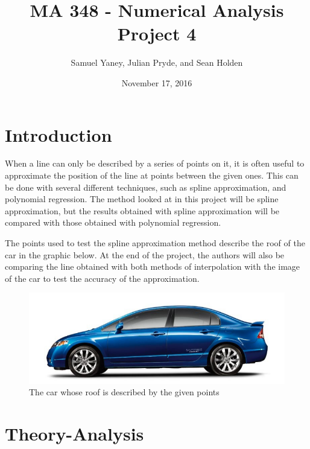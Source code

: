 \documentclass[12pt, letterpaper]{article} %
\begin{document}
\title{MA 348 - Numerical Analysis \\ Project 4}
\author{Samuel Yaney, Julian Pryde, and Sean Holden}
\date{November 17, 2016}
\maketitle

\section{Introduction}

When a line can only be described by a series of points on it, it is often useful to approximate the position of the line at points between the given ones. This can be done with several different techniques, such as spline approximation, and polynomial regression. The method looked at in this project will be spline approximation, but the results obtained with spline approximation will be compared with those obtained with polynomial regression.

The points used to test the spline approximation method describe the roof of the car in the graphic below. At the end of the project, the authors will also be comparing the line obtained with both methods of interpolation with the image of the car to test the accuracy of the approximation.

\begin{center}
	\begin{figure}
		\includegraphics[scale=0.5]{Car.png}
		\caption{The car whose roof is described by the given points}
	\end{figure}
\end{center}

\section{Theory-Analysis}
\end{document}
